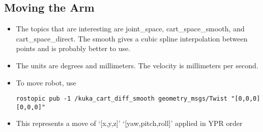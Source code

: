 \documentclass[12pt,letterpaper]{article}
\begin{document}
\subsection{Moving the Arm}
\begin{itemize}
\item The topics that are interesting are joint\_space, cart\_space\_smooth, and cart\_space\_direct.
The smooth gives a cubic spline interpolation between points and is probably better to use.

\item The units are degrees and millimeters.
The velocity is millimeters per second.

\item To move robot, use
\begin{lstlisting}
rostopic pub -1 /kuka_cart_diff_smooth geometry_msgs/Twist "[0,0,0][0,0,0]"
\end{lstlisting}

\item This represents a move of ‘[x,y,z]’ ‘[yaw,pitch,roll]’ applied in YPR order

\end{itemize}
\end{document}

